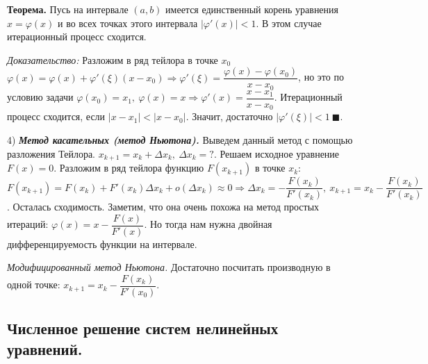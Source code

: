 \documentclass[9pt]{article}
\begin{document}
\par\textbf{Теорема.} Пусь на интервале \((a,b)\) имеется единственный корень уравнения \(x=\varphi(x)\) и во всех точках этого интервала \(|\varphi'(x)|<1\). В этом случае итерационный процесс сходится.
\par\textit{Доказательство:} Разложим в ряд тейлора в точке \(x_0\) \(\varphi(x)=\varphi(x)+\varphi'(\xi)(x-x_0)\Rightarrow\varphi'(\xi)=\dfrac{\varphi(x)-\varphi(x_0)}{x-x_0}\), но это по условию задачи \(\varphi(x_0)=x_1,\ \varphi(x)=x\Rightarrow\varphi'(x)=\dfrac{x-x_1}{x-x_0}\). Итерационный процесс сходится, если \(|x-x_1|<|x-x_0|\). Значит, достаточно \(|\varphi'(\xi)|<1\ \blacksquare\).
\par4) \textbf{\textit{Метод касательных (метод Ньютона).}} Выведем данный метод с помощью разложения Тейлора. \(x_{k+1}=x_k+\Delta x_k,\ \Delta x_k=?\). Решаем исходное уравнение \(F(x)=0\). Разложим в ряд тейлора функцию \(F(x_{k+1})\) в точке \(x_k\): \(F(x_{k+1})=F(x_k)+F'(x_k)\Delta x_k+o(\Delta x_k)\approx0\Rightarrow\Delta x_k=-\dfrac{F(x_k)}{F'(x_k)},\ x_{k+1}=x_k-\dfrac{F(x_k)}{F'(x_k)}\). Осталась сходимость. Заметим, что она очень похожа на метод простых итераций: \(\varphi(x)=x-\dfrac{F(x)}{F'(x)}\). Но тогда нам нужна двойная дифференцируемость функции на интервале.
\par\textit{Модифицированный метод Ньютона.} Достаточно посчитать производную в одной точке: \(x_{k+1}=x_k-\dfrac{F(x_k)}{F'(x_0)}\).

\subsection{Численное решение систем нелинейных уравнений.}
\end{document}
